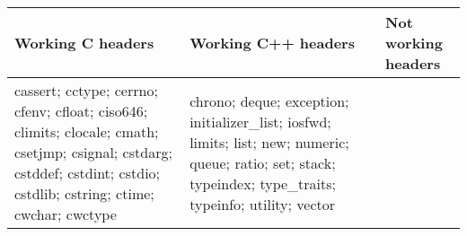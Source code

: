 \documentclass[10pt,a4paper]{article}
\begin{document}
\begin{center}
  \begin{tabular}{ | p{3cm} | p{3cm} | p{3cm} |}
    \hline
    Working \newline C headers & Working \newline C++ headers & Not working \newline headers \\ \hline
cassert; \newline 
cctype; \newline
cerrno; \newline
cfenv; \newline
cfloat; \newline
ciso646; \newline 
climits; \newline
clocale; \newline
cmath; \newline
csetjmp; \newline
csignal; \newline
cstdarg; \newline
cstddef; \newline
cstdint; \newline
cstdio; \newline
cstdlib; \newline
cstring; \newline
ctime; \newline
cwchar; \newline
cwctype & 

chrono; \newline
deque; \newline
exception; \newline
initializer\_list; \newline
iosfwd; \newline
limits; \newline
list; \newline
new; \newline
numeric; \newline
queue; \newline
ratio; \newline
set; \newline
stack; \newline
typeindex; \newline
type\_traits; \newline
typeinfo; \newline
utility; \newline
vector & 


\end{tabular}
\end{center}
\end{document}
